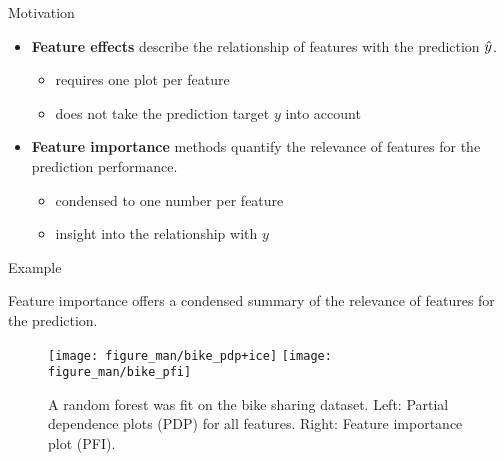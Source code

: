 	
	
	

	

\begin{vbframe}{Motivation}
\begin{itemize}
  \item \textbf{Feature effects} describe the relationship of features with the prediction $\hat{y}$.
  \begin{itemize}
    \item requires one plot per feature
    \item does not take the prediction target $y$ into account
  \end{itemize}
  \item \textbf{Feature importance} methods quantify the relevance of features for the prediction performance.
  \begin{itemize}
    \item condensed to one number per feature
    \item insight into the relationship with $y$
  \end{itemize}
\end{itemize}

\end{vbframe}
\begin{vbframe}{Example}

Feature importance offers a condensed summary of the relevance of features for the prediction.

\begin{center}
  \begin{figure}
  \texttt{[image: figure\_man/bike\_pdp+ice]} \hfill \texttt{[image: figure\_man/bike\_pfi]}
  \caption{A random forest was fit on the bike sharing dataset. Left: Partial dependence plots (PDP) for all features. Right: Feature importance plot (PFI).}
\end{figure}
\end{center}

\end{vbframe}

